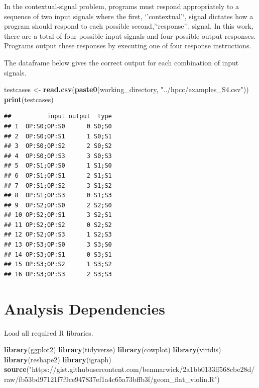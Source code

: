 \documentclass[
]{book}
\newenvironment{Shaded}{\begin{snugshade}}{\end{snugshade}}
\newcommand{\KeywordTok}[1]{\textcolor[rgb]{0.13,0.29,0.53}{\textbf{#1}}}
\newcommand{\NormalTok}[1]{#1}
\newcommand{\StringTok}[1]{\textcolor[rgb]{0.31,0.60,0.02}{#1}}
\begin{document}
In the contextual-signal problem, programs must respond appropriately to a sequence of two input signals where the first, `'contextual'`, signal dictates how a program should respond to each possible second,'`response'', signal.
In this work, there are a total of four possible input signals and four possible output responses.
Programs output these responses by executing one of four response instructions.

The dataframe below gives the correct output for each combination of input signals.

\begin{Shaded}
\begin{Highlighting}[]
\NormalTok{testcases \textless{}{-}}\StringTok{ }\KeywordTok{read.csv}\NormalTok{(}\KeywordTok{paste0}\NormalTok{(working\_directory, }\StringTok{"../hpcc/examples\_S4.csv"}\NormalTok{))}
\KeywordTok{print}\NormalTok{(testcases)}
\end{Highlighting}
\end{Shaded}

\begin{verbatim}
##          input output  type
## 1  OP:S0;OP:S0      0 S0;S0
## 2  OP:S0;OP:S1      1 S0;S1
## 3  OP:S0;OP:S2      2 S0;S2
## 4  OP:S0;OP:S3      3 S0;S3
## 5  OP:S1;OP:S0      1 S1;S0
## 6  OP:S1;OP:S1      2 S1;S1
## 7  OP:S1;OP:S2      3 S1;S2
## 8  OP:S1;OP:S3      0 S1;S3
## 9  OP:S2;OP:S0      2 S2;S0
## 10 OP:S2;OP:S1      3 S2;S1
## 11 OP:S2;OP:S2      0 S2;S2
## 12 OP:S2;OP:S3      1 S2;S3
## 13 OP:S3;OP:S0      3 S3;S0
## 14 OP:S3;OP:S1      0 S3;S1
## 15 OP:S3;OP:S2      1 S3;S2
## 16 OP:S3;OP:S3      2 S3;S3
\end{verbatim}

\hypertarget{analysis-dependencies-2}{%
\section{Analysis Dependencies}\label{analysis-dependencies-2}}

Load all required R libraries.

\begin{Shaded}
\begin{Highlighting}[]
\KeywordTok{library}\NormalTok{(ggplot2)}
\KeywordTok{library}\NormalTok{(tidyverse)}
\KeywordTok{library}\NormalTok{(cowplot)}
\KeywordTok{library}\NormalTok{(viridis)}
\KeywordTok{library}\NormalTok{(reshape2)}
\KeywordTok{library}\NormalTok{(igraph)}
\KeywordTok{source}\NormalTok{(}\StringTok{"https://gist.githubusercontent.com/benmarwick/2a1bb0133ff568cbe28d/raw/fb53bd97121f7f9ce947837ef1a4c65a73bffb3f/geom\_flat\_violin.R"}\NormalTok{)}
\end{Highlighting}
\end{Shaded}
\end{document}
